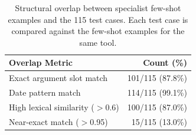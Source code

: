 \begin{table}[h]
\centering
\small
\caption{Structural overlap between specialist few-shot examples and the 115 test cases. Each test case is compared against the few-shot examples for the same tool.}
\label{tab:fewshot_overlap}
\begin{tabular}{@{}lr@{}}
\toprule
\textbf{Overlap Metric} & \textbf{Count (\%)} \\
\midrule
Exact argument slot match & 101/115 (87.8\%) \\
Date pattern match & 114/115 (99.1\%) \\
High lexical similarity ($>$0.6) & 100/115 (87.0\%) \\
Near-exact match ($>$0.95) & 15/115 (13.0\%) \\
\bottomrule
\end{tabular}
\end{table}